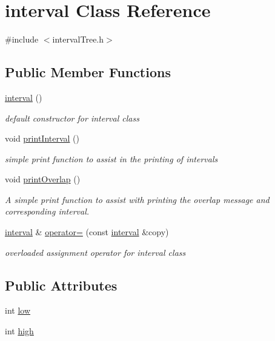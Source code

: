 \hypertarget{classinterval}{\section{interval Class Reference}
\label{classinterval}
}


{\ttfamily \#include $<$interval\-Tree.\-h$>$}

\subsection*{Public Member Functions}
\begin{DoxyCompactItemize}
\item 
\hyperlink{classinterval_acbedd1641f77c0c8007c75ff3f10bb11}{interval} ()
\begin{DoxyCompactList}\small\item\em default constructor for interval class \end{DoxyCompactList}\item 
void \hyperlink{classinterval_aee1bf3284b08b4a970eab2542f6c70b5}{print\-Interval} ()
\begin{DoxyCompactList}\small\item\em simple print function to assist in the printing of intervals \end{DoxyCompactList}\item 
void \hyperlink{classinterval_a9e6d9ce819b244e13cd0a67ee07a7662}{print\-Overlap} ()
\begin{DoxyCompactList}\small\item\em A simple print function to assist with printing the overlap message and corresponding interval. \end{DoxyCompactList}\item 
\hyperlink{classinterval}{interval} \& \hyperlink{classinterval_a8df4ff2ea0ec21a796adf82131997c9c}{operator=} (const \hyperlink{classinterval}{interval} \&copy)
\begin{DoxyCompactList}\small\item\em overloaded assignment operator for interval class \end{DoxyCompactList}\end{DoxyCompactItemize}
\subsection*{Public Attributes}
\begin{DoxyCompactItemize}
\item 
int \hyperlink{classinterval_a45194f7bc3d189bba5868223ece0c303}{low}
\item 
int \hyperlink{classinterval_acc96c4f9dc2076c99c69984418144113}{high}
\end{DoxyCompactItemize}


